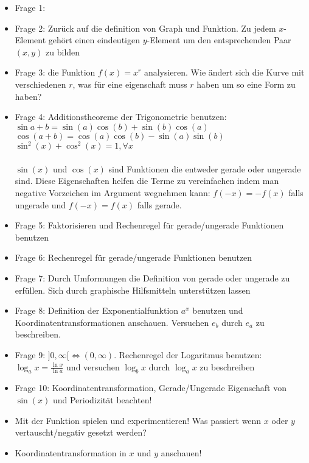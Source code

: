 \documentclass[11pt]{article} %
\begin{document}
\begin{itemize}
\item Frage 1: 
\item Frage 2: Zurück auf die definition von Graph und Funktion. Zu jedem $x$-Element gehört einen eindeutigen $y$-Element um den entsprechenden Paar $(x,y)$ zu bilden
\item Frage 3: die Funktion $f(x) = x^r$  analysieren. Wie ändert sich die Kurve mit verschiedenen $r$, was für eine eigenschaft muss $r$ haben um so eine Form zu haben?
\item Frage 4: Additionstheoreme der Trigonometrie benutzen: \\
$\sin{a + b} = \sin(a)\cos(b) + \sin(b)\cos(a)$\\
$\cos(a + b) = \cos(a)\cos(b) - \sin(a)\sin(b)$\\
$\sin^2(x) + \cos^2(x) = 1, \forall x$\\\\
$\sin(x)$ und $\cos(x)$ sind Funktionen die entweder gerade oder ungerade sind. Diese Eigenschaften helfen die Terme zu vereinfachen indem man negative Vorzeichen im Argument wegnehmen kann: $f(-x) = -f(x)$ falls ungerade und $f(-x) = f(x)$ falls gerade.

\item Frage 5: Faktorisieren und Rechenregel für gerade/ungerade Funktionen benutzen
\item Frage 6: Rechenregel für gerade/ungerade Funktionen benutzen
\item Frage 7: Durch Umformungen die Definition von gerade oder ungerade zu erfüllen. Sich durch graphische Hilfsmitteln unterstützen lassen
\item Frage 8: Definition der Exponentialfunktion $a^x$ benutzen und Koordinatentransformationen anschauen. Versuchen $e_b$ durch $e_a$ zu beschreiben.
\item Frage 9: $]0,\infty[ \Leftrightarrow (0,\infty)$. Rechenregel der Logaritmus benutzen: $\log_ax = \frac{\ln x}{\ln a}$ und versuchen $\log_bx $ durch $\log_ax$ zu beschreiben
\item Frage 10: Koordinatentransformation, Gerade/Ungerade Eigenschaft von $\sin(x)$ und Periodizität beachten!
\item Mit der Funktion spielen und experimentieren! Was passiert wenn $x$ oder $y$ vertauscht/negativ gesetzt werden?
\item Koordinatentransformation in $x$ und $y$ anschauen!
\end{itemize}
\end{document}
